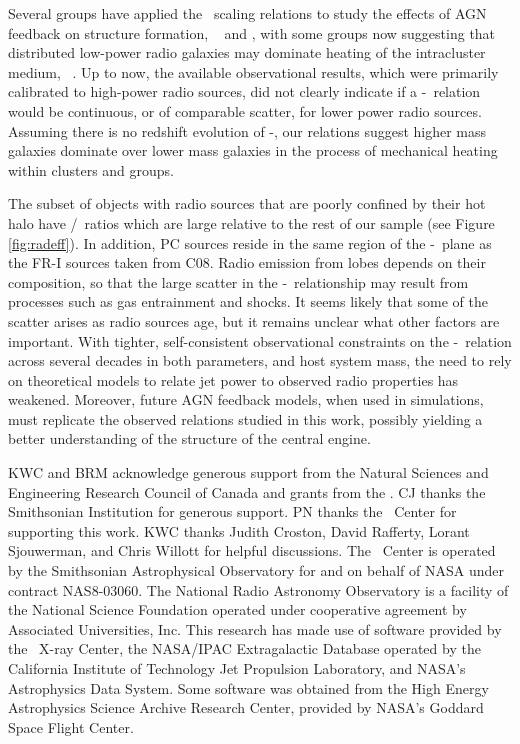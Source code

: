 \documentclass[12pt, preprint]{aastex}
\begin{document}
Several groups have applied the \birzan\ scaling relations to study
the effects of AGN feedback on structure formation,
\eg\ \citet{best07} and \citet{2007MNRAS.379..260M}, with some groups
now suggesting that distributed low-power radio galaxies may dominate
heating of the intracluster medium,
\eg\ \citet{2009ApJ...705..854H}. Up to now, the available
observational results, which were primarily calibrated to high-power
radio sources, did not clearly indicate if a \pjet-\prad\ relation
would be continuous, or of comparable scatter, for lower power radio
sources. Assuming there is no redshift evolution of \pjet-\prad, our
relations suggest higher mass galaxies dominate over lower mass
galaxies in the process of mechanical heating within clusters and
groups.

The subset of objects with radio sources that are poorly confined by
their hot halo have \prad/\pjet\ ratios which are large relative to
the rest of our sample (see Figure \ref{fig:radeff}). In addition, PC
sources reside in the same region of the \pjet-\prad\ plane as the
FR-I sources taken from C08. Radio emission from lobes depends on
their composition, so that the large scatter in the
\pjet-\prad\ relationship may result from processes such as gas
entrainment and shocks. It seems likely that some of the scatter
arises as radio sources age, but it remains unclear what other factors
are important. With tighter, self-consistent observational constraints
on the \pjet-\prad\ relation across several decades in both
parameters, and host system mass, the need to rely on theoretical
models to relate jet power to observed radio properties has
weakened. Moreover, future AGN feedback models, when used in
simulations, must replicate the observed relations studied in this
work, possibly yielding a better understanding of the structure of the
central engine.

\acknowledgements

KWC and BRM acknowledge generous support from the Natural Sciences and
Engineering Research Council of Canada and grants from the \cxo. CJ
thanks the Smithsonian Institution for generous support. PN thanks the
\cxo\ Center for supporting this work. KWC thanks Judith Croston,
David Rafferty, Lorant Sjouwerman, and Chris Willott for helpful
discussions. The \cxo\ Center is operated by the Smithsonian
Astrophysical Observatory for and on behalf of NASA under contract
NAS8-03060. The National Radio Astronomy Observatory is a facility of
the National Science Foundation operated under cooperative agreement
by Associated Universities, Inc. This research has made use of
software provided by the \chandra\ X-ray Center, the NASA/IPAC
Extragalactic Database operated by the California Institute of
Technology Jet Propulsion Laboratory, and NASA's Astrophysics Data
System. Some software was obtained from the High Energy Astrophysics
Science Archive Research Center, provided by NASA's Goddard Space
Flight Center.
\end{document}
